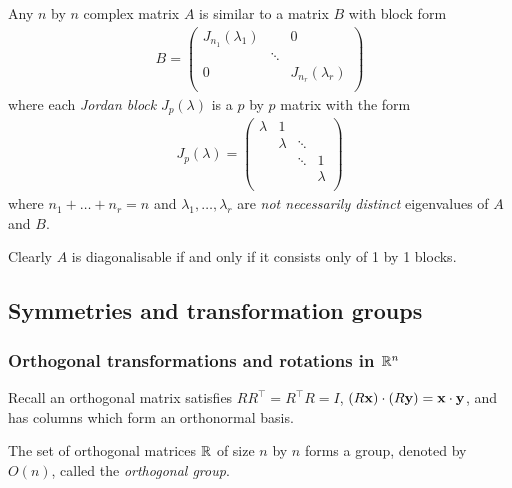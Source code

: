 \documentclass{../template/note}
\begin{document}
    \begin{theorem}
        Any \(n\) by \(n\) complex matrix \(A\) is similar to a matrix \(B\) with block form
        \begin{align*}
            B = \begin{pmatrix}
                J_{n_1}(\lambda_1) & & 0 \\
                 & \ddots & \\
                0 & & J_{n_r}(\lambda_r) \\
            \end{pmatrix}
        \end{align*}
        where each \emph{Jordan block} \(J_p(\lambda)\) is a \(p\) by \(p\) matrix with the form
        \begin{align*}
            J_p(\lambda) = \begin{pmatrix}
                \lambda & 1 &  &  \\
                 & \lambda & \ddots &  \\
                 &  & \ddots & 1 \\
                 &  &  & \lambda \\
            \end{pmatrix}
        \end{align*}
        where \(n_1 + \dots + n_r = n\) and \(\lambda_1, \dots, \lambda_r\) are \emph{not necessarily distinct} eigenvalues of \(A\) and \(B\).
    \end{theorem}
    
    Clearly \(A\) is diagonalisable if and only if it consists only of 1 by 1 blocks.

    \subsection{Symmetries and transformation groups}

    \subsubsection{Orthogonal transformations and rotations in \(\mathbb R^n\)}

    Recall an orthogonal matrix satisfies \(RR^\intercal = R^\intercal R = I\), \((R\V x) \cdot (R\V y) = \V x \cdot \V y\), and has columns which form an orthonormal basis.
    
    \begin{definition}
        The set of orthogonal matrices \(\mathbb R\) of size \(n\) by \(n\) forms a group, denoted by \(O(n)\), called the \emph{orthogonal group}.
    \end{definition}
    
\end{document}
